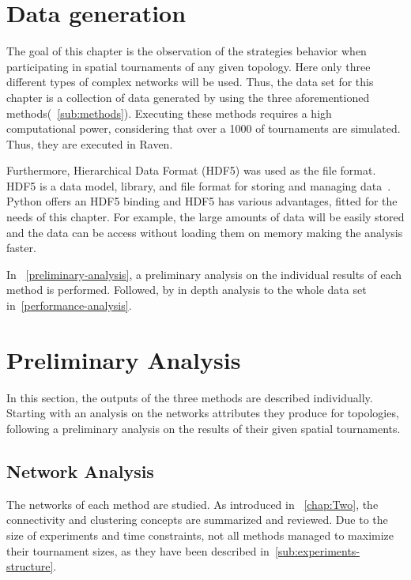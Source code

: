 \section{Data generation}
The goal of this chapter is the observation of the strategies behavior when
participating in spatial tournaments of any given topology. Here only three
different types of complex networks will be used. Thus, the data set for this
chapter is a collection of data generated by using the three aforementioned
methods(~\autoref{sub:methods}). Executing these methods requires a high
computational power, considering that over a 1000 of tournaments are
simulated. Thus, they are executed in Raven.

Furthermore, Hierarchical Data Format (HDF5) was used as the file format.
HDF5 is a data model, library, and file format for storing and managing data~\cite{hdf5}.
Python offers an HDF5 binding and HDF5 has various advantages, fitted for the needs
of this chapter. For example, the large amounts of data will be easily stored
and the data can be access without loading them on memory making the analysis
faster.

In ~\autoref{preliminary-analysis}, a preliminary analysis on the individual results of each method
is performed. Followed, by in depth analysis to the whole data set in~\autoref{performance-analysis}.

\section{Preliminary Analysis}
\label{preliminary-analysis}
In this section, the outputs of the three methods are described individually.
Starting with an analysis on the networks attributes they produce for topologies,
following a preliminary analysis on the results of their given spatial tournaments.


\subsection{Network Analysis}
\label{sub:network-analysis}
The networks of each method are studied. As introduced in ~\autoref{chap:Two}, the
connectivity and clustering concepts are summarized and reviewed. Due to the
size of experiments and time constraints, not all methods managed to
maximize their tournament sizes, as they have been described in~\autoref{sub:experiments-structure}.

